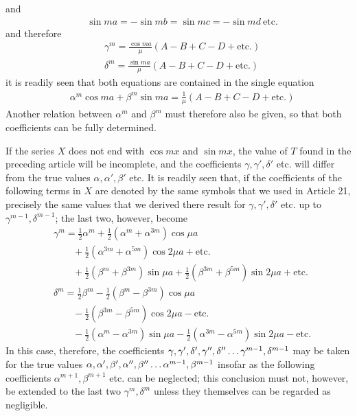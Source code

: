 and
\[
\begin{aligned}
&\sin ma=-\sin mb=\sin mc=-\sin md\ \mathrm{etc.}
\end{aligned}
\]
and therefore
\[
\begin{aligned}
&\gamma^m=\frac{\cos ma}{\mu}(A-B+C-D+\mathrm{etc.})\\[5pt]
&\delta^m=\frac{\sin ma}{\mu}(A-B+C-D+\mathrm{etc.})
\end{aligned}
\]
it is readily seen that both equations are contained in the single equation
\[
\begin{aligned}
&\alpha^m\cos ma+\beta^m\sin ma=\frac1\mu(A-B+C-D+\mathrm{etc.})
\end{aligned}
\]
Another relation between $\alpha^m$ and $\beta^m$ must therefore also be given, so that both coefficients can be fully determined.

If the series $X$ does not end with $\cos mx$ and $\sin mx$, the value of $T$
found in the preceding article will be incomplete, and the coefficients $\gamma,\gamma',\delta'$ etc. will differ from the true values
$\alpha,\alpha',\beta'$ etc. It is readily seen that, if the coefficients of the following terms in $X$ are denoted by the same symbols that we used in Article 21,
precisely the same values that we derived there result for $\gamma,\gamma',\delta'$ etc. up to $\gamma^{m-1},\delta^{m-1}$;
the last two, however, become
\[
\begin{aligned}
&\gamma^m=\frac12\alpha^m+\frac12(\alpha^m+\alpha^{3m})\cos\mu a\\[5pt]&\qquad{}+\frac12(\alpha^{3m}+\alpha^{5m})\cos2\mu a+\mathrm{etc.}\\[5pt]
&\qquad +\frac12(\beta^m+\beta^{3m})\sin\mu a+\frac12(\beta^{3m}+\beta^{5m})\sin2\mu a+\mathrm{etc.}\\[5pt]
&\delta^m=\frac12\beta^m-\frac12(\beta^m-\beta^{3m})\cos\mu a\\[5pt]&\qquad{}-\frac12(\beta^{3m}-\beta^{5m})\cos2\mu a-\mathrm{etc.}\\[5pt]
&\qquad -\frac12(\alpha^m-\alpha^{3m})\sin\mu a-\frac12(\alpha^{3m}-\alpha^{5m})\sin2\mu a-\mathrm{etc.}
\end{aligned}
\]
In this case, therefore, the coefficients $\gamma,\gamma',\delta',\gamma'',\delta''\mathinner{.\,.\,.}\gamma^{m-1},\delta^{m-1}$ may be taken for the true values
$\alpha,\alpha',\beta',\alpha'',\beta''\mathinner{.\,.\,.}\alpha^{m-1},\beta^{m-1}$ insofar as the following coefficients $\alpha^{m+1},\beta^{m+1}$ etc.
can be neglected; this conclusion must not, however, be extended to the last two $\gamma^m,\delta^m$ unless they themselves can be regarded as negligible.

\endgroup
